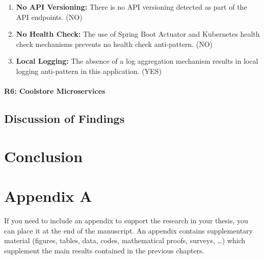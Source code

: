 \documentclass{Configuration_Files/PoliMi3i_thesis}
\begin{document}
\begin{enumerate}
    \item \textbf{No API Versioning:} There is no API versioning detected as part of the API endpoints. (NO)
    
    \item \textbf{No Health Check:} The use of Spring Boot Actuator and Kubernetes health check mechanisms prevents no health check anti-pattern. (NO)
    
    \item \textbf{Local Logging:} The absence of a log aggregation mechanism results in local logging anti-pattern in this application. (YES)
\end{enumerate}

\subsubsection{R6: Coolstore Microservices}
\label{subsubsec:R6}

\section{Discussion of Findings}
\label{sec:discussion}


\chapter{Conclusion}
\label{ch:conclusion}%





\cleardoublepage
{} %
\appendix
\chapter{Appendix A}
If you need to include an appendix to support the research in your thesis, you can place it at the end of the manuscript.
An appendix contains supplementary material (figures, tables, data, codes, mathematical proofs, surveys, \dots)
which supplement the main results contained in the previous chapters.
\end{document}
